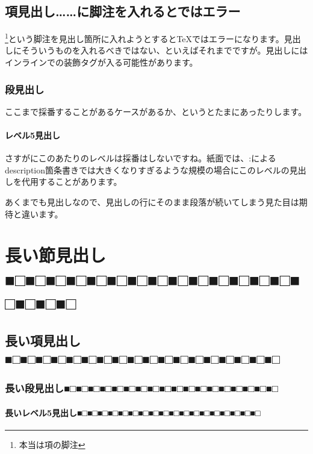 \subsection{項見出し……に脚注を入れるとではエラー}
\label{sec:1-1-1}

\footnote{本当は項の脚注}という脚注を見出し箇所に入れようとするとTeXではエラーになります。見出しにそういうものを入れるべきではない、といえばそれまでですが。見出しにはインラインでの装飾タグが入る可能性があります。

\subsubsection{段見出し}
\label{sec:1-1-1-1}

ここまで採番することがあるケースがあるか、というとたまにあったりします。

\paragraph*{レベル5見出し}
\label{sec:1-1-1-1-1}

さすがにこのあたりのレベルは採番はしないですね。紙面では、:によるdescription箇条書きでは大きくなりすぎるような規模の場合にこのレベルの見出しを代用することがあります。

あくまでも見出しなので、見出しの行にそのまま段落が続いてしまう見た目は期待と違います。

\section{長い節見出し■□■□■□■□■□■□■□■□■□■□■□■□■□■□■□■□■□■□}
\label{sec:1-2}

\subsection{長い項見出し■□■□■□■□■□■□■□■□■□■□■□■□■□■□■□■□■□■□}
\label{sec:1-2-1}

\subsubsection{長い段見出し■□■□■□■□■□■□■□■□■□■□■□■□■□■□■□■□■□■□}
\label{sec:1-2-1-1}

\paragraph*{長いレベル5見出し■□■□■□■□■□■□■□■□■□■□■□■□■□■□■□■□■□■□}
\label{sec:1-2-1-1-1}

